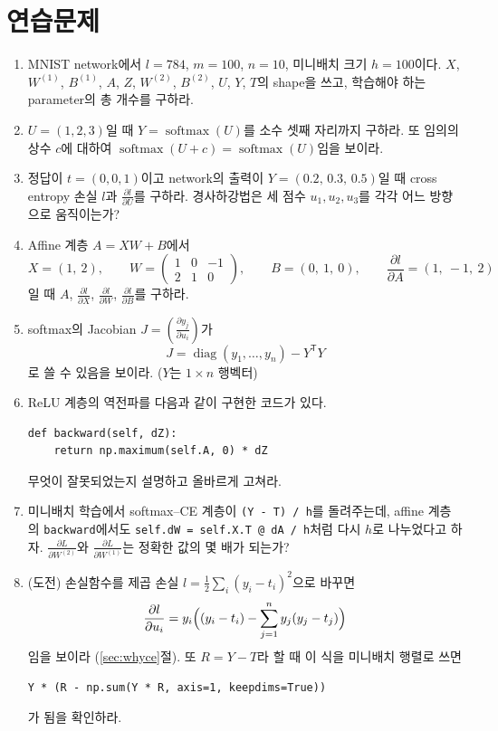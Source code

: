 \documentclass[11pt,a4paper]{article}
\newcommand{\T}{^{\mathsf T}}
\newcommand{\pd}[2]{\frac{\partial #1}{\partial #2}}
\newcommand{\softmax}{\operatorname{softmax}}
\begin{document}
\section{연습문제}

\begin{enumerate}[label=\arabic*.]

\item MNIST network에서 $l=784$, $m=100$, $n=10$, 미니배치 크기 $h=100$이다.
$X$, $W^{(1)}$, $B^{(1)}$, $A$, $Z$, $W^{(2)}$, $B^{(2)}$, $U$, $Y$, $T$의 shape을 쓰고,
학습해야 하는 parameter의 총 개수를 구하라.

\item $U=(1,2,3)$일 때 $Y=\softmax(U)$를 소수 셋째 자리까지 구하라.
또 임의의 상수 $c$에 대하여 $\softmax(U+c)=\softmax(U)$임을 보이라.

\item 정답이 $t=(0,0,1)$이고 network의 출력이 $Y=(0.2,\,0.3,\,0.5)$일 때
cross entropy 손실 $l$과 $\pd{l}{U}$를 구하라.
경사하강법은 세 점수 $u_1,u_2,u_3$를 각각 어느 방향으로 움직이는가?

\item Affine 계층 $A=XW+B$에서
\[
X=(1,\ 2),\qquad
W=\begin{pmatrix}1&0&-1\\2&1&0\end{pmatrix},\qquad
B=(0,\ 1,\ 0),\qquad
\pd{l}{A}=(1,\ -1,\ 2)
\]
일 때 $A$, $\pd{l}{X}$, $\pd{l}{W}$, $\pd{l}{B}$를 구하라.

\item softmax의 Jacobian $J=\left(\pd{y_j}{u_i}\right)$가
\[
J=\operatorname{diag}(y_1,\ldots,y_n)-Y\T Y
\]
로 쓸 수 있음을 보이라. ($Y$는 $1\times n$ 행벡터)

\item ReLU 계층의 역전파를 다음과 같이 구현한 코드가 있다.
\begin{lstlisting}
def backward(self, dZ):
    return np.maximum(self.A, 0) * dZ
\end{lstlisting}
무엇이 잘못되었는지 설명하고 올바르게 고쳐라.

\item 미니배치 학습에서 softmax--CE 계층이 \texttt{(Y - T) / h}를 돌려주는데,
affine 계층의 \texttt{backward}에서도 \texttt{self.dW = self.X.T @ dA / h}처럼 다시 $h$로 나누었다고 하자.
$\pd{L}{W^{(2)}}$와 $\pd{L}{W^{(1)}}$는 정확한 값의 몇 배가 되는가?

\item (도전) 손실함수를 제곱 손실 $l=\frac12\sum_i(y_i-t_i)^2$으로 바꾸면
\[
\pd{l}{u_i}=y_i\Bigl((y_i-t_i)-\sum_{j=1}^{n}y_j(y_j-t_j)\Bigr)
\]
임을 보이라 (\ref{sec:whyce}절). 또 $R=Y-T$라 할 때 이 식을 미니배치 행렬로 쓰면
\begin{lstlisting}
Y * (R - np.sum(Y * R, axis=1, keepdims=True))
\end{lstlisting}
가 됨을 확인하라.

\end{enumerate}
\end{document}

